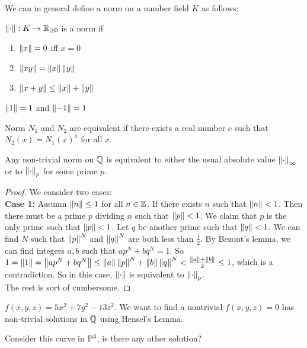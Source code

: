 \documentclass[15pt]{scrartcl}
\begin{document}
We can in general define a norm on a number field $K$ as follows: 
\begin{definition}
    $\left\lVert \cdot \right\rVert: K\to \mathbb R_{\geq 0}$ is a norm if
    \begin{enumerate}
        \item $\left\lVert x \right\rVert=0$ iff $x=0$
        \item $\left\lVert xy \right\rVert=\left\lVert x \right\rVert\left\lVert y \right\rVert$
        \item $\left\lVert x+y \right\rVert\leq \left\lVert x \right\rVert+\left\lVert y \right\rVert$
    \end{enumerate}
\end{definition}
\begin{corollary}
    $\left\lVert 1 \right\rVert=1$ and $\left\lVert -1 \right\rVert=1$
\end{corollary}
\begin{definition}
    Norm $N_1$ and $N_2$ are equivalent if there exists a real number $c$ such that $N_2(x)=N_1(x)^a$ for all $x$.
\end{definition}
\begin{theorem}
    Any non-trivial norm on $\mathbb Q$ is equivalent to either the usual absolute value $\left\lVert \cdot \right\rVert_\infty$ or to $\left\lVert \cdot \right\rVert_p$ for some prime $p$.
\end{theorem}
\begin{proof}
    We consider two cases:
    \\

    \textbf{Case 1:} Assumn $\left\lVert n \right\rVert\leq 1$ for all $n\in \mathbb Z$. If there exists $n$ such that $\left\lVert n \right\rVert<1$. Then there must be a prime $p$ dividing $n$ such that $\left\lVert p \right\rVert<1$. We claim that $p$ is the only prime such that $\left\lVert p \right\rVert<1$. Let $q$ be another prime such that $\left\lVert q \right\rVert<1$. We can find $N$ such that $\left\lVert p \right\rVert^N$ and $\left\lVert q \right\rVert^N$ are both less than $\frac{1}{2}$. By Bezout's lemma, we can find integers $a,b$ such that $ap^N+bq^N=1$. So $1=\left\lVert 1 \right\rVert=\left\lVert ap^N+bq^N \right\rVert\leq \left\lVert a \right\rVert\left\lVert p \right\rVert^N+\left\lVert b \right\rVert\left\lVert q \right\rVert^N<\frac{\left\lVert a \right\rVert+\left\lVert b \right\rVert}{2}\leq 1$, which is a contradiction. So in this case, $\left\lVert \cdot \right\rVert$ is equivalent to $\left\lVert \cdot \right\rVert_p$.
    \\

    The rest is sort of cumbersome. 
\end{proof}
\begin{example}
    $f(x,y,z)=5x^2+7y^2-13z^2$. We want to find a nontrivial $f(x,y,z)=0$ has non-trivial solutions in $\mathbb Q$ using Hensel's Lemma. 
\end{example}
Consider this curve in $\mathbb P^3$, is there any other solution? 
\\
\end{document}
